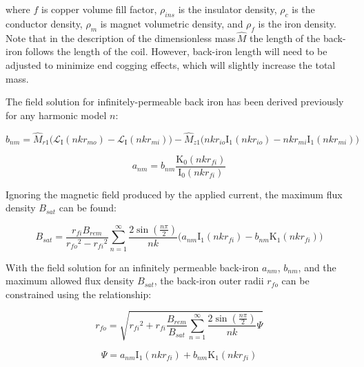         
        where $f$ is copper volume fill factor, $\rho_{ins}$ is the insulator density, $\rho_c$ is the conductor density, $\rho_m$ is magnet volumetric density, and $\rho_f$ is the iron density. Note that in the description of the dimensionless mass\,$\hat M$ the length of the back-iron follows the length of the coil. However, back-iron length will need to be adjusted to minimize end cogging effects, which will slightly increase the total mass. 
        
        
        The field solution for infinitely-permeable back iron has been derived previously\,\cite{ruddy2014} for any harmonic model $n$:


        \begin{equation}
            b_{nm}=\hat{M}_{r1}\Big(\mathcal{L}_{\mathrm{I}}(nkr_{mo})
            -\mathcal{L}_{\mathrm{I}}(nkr_{mi})\Big)-\hat{M}_{z1}\Big(nkr_{io}\mathrm{I}_1(nkr_{io})-nkr_{mi}\mathrm{I}_1(nkr_{mi})\Big)
            \label{eq:bnm}
        \end{equation}
        
        
        \begin{equation}
            a_{nm}=b_{nm}\frac{\mathrm{K}_0(nkr_{fi})}{\mathrm{I}_0(nkr_{fi})}
            \label{eq:anm}
        \end{equation}
        
        
        Ignoring the magnetic field produced by the applied current, the maximum flux density $B_{sat}$ can be found:
        

        \begin{equation}
            B_{sat}=\frac{r_{fi} B_{rem}}{{r_{fo}}^2-{r_{fi}}^2}\sum_{n=1}^\infty\frac{2\sin \left(\frac{n\pi}{2}\right)}{nk}\Big(a_{nm}\mathrm{I}_{1}(nkr_{fi})-b_{nm}\mathrm{K}_{1}(nkr_{fi})\Big)
            \label{eq:Bsat}
        \end{equation}
        
        
        With the field solution for an infinitely permeable back-iron $a_{nm}$, $b_{nm}$, and the maximum allowed flux density $B_{sat}$, the back-iron outer radii $r_{fo}$ can be constrained using the relationship:


        \begin{equation}
            r_{fo}=\sqrt{{r_{fi}}^2+r_{fi}\frac{B_{rem}}{B_{sat}}\sum_{n=1}^\infty{\frac{{2\sin ( {\frac{{n\pi }}{2}} )}}{{nk}}\Psi }}
            \label{eq:r_fo}
        \end{equation}
        
        \begin{equation}
            \Psi  = {a_{nm}}{{\textrm{I}}_{\textrm{1}}}\left( {nk{r_{fi}}} \right) + {b_{nm}}{{\textrm{K}}_{\textrm{1}}}\left( {nk{r_{fi}}} \right)
            \label{eq:psi}
        \end{equation}
        
